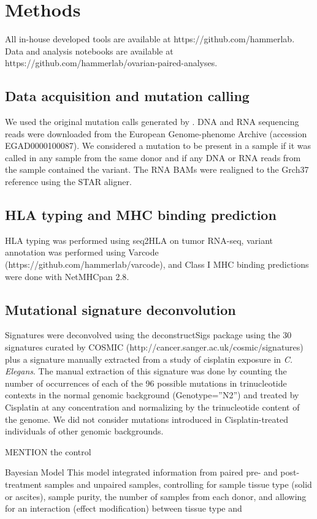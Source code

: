 \section*{Methods}
All in-house developed tools are available at https://github.com/hammerlab. Data and analysis notebooks are available at https://github.com/hammerlab/ovarian-paired-analyses.

\subsection*{Data acquisition and mutation calling}
We used the original mutation calls generated by \cite{Patch_2015}. DNA and RNA sequencing reads were downloaded from the European Genome-phenome Archive (accession EGAD0000100087). We considered a mutation to be present in a sample if it was called in any sample from the same donor and if any DNA or RNA reads from the sample contained the variant. The RNA BAMs were realigned to the Grch37 reference using the STAR aligner.

\subsection*{HLA typing and MHC binding prediction}
HLA typing was performed using seq2HLA\cite{Boegel_2012} on tumor RNA-seq, variant annotation was performed using Varcode (https://github.com/hammerlab/varcode), and Class I MHC binding predictions were done with NetMHCpan 2.8\cite{Lundegaard_2008}.

\subsection*{Mutational signature deconvolution}
Signatures were deconvolved using the deconstructSigs\cite{Rosenthal_2016} package using the 30 signatures curated by COSMIC (http://cancer.sanger.ac.uk/cosmic/signatures) plus a signature manually extracted from a study of cisplatin exposure in \textit{C. Elegans}\cite{Meier_2014}. The manual extraction of this signature was done by counting the number of occurrences of each of the 96 possible mutations in trinucleotide contexts in the normal genomic background (Genotype=”N2”) and treated by Cisplatin at any concentration and normalizing by the trinucleotide content of the  genome. We did not consider mutations introduced in Cisplatin-treated individuals of other genomic backgrounds.

MENTION the control

Bayesian Model
 This model integrated information from paired pre- and post-treatment samples and unpaired samples, controlling for sample tissue type (solid or ascites), sample purity, the number of samples from each donor, and allowing for an interaction (effect modification) between tissue type and 


